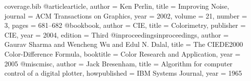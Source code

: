\begin{filecontents*}[overwrite]{coverage.bib}
@article{article, author = {Ken Perlin}, title = {Improving Noise}, journal = {ACM Transactions on Graphics}, year = {2002}, volume = {21}, number = {3}, pages = {681--682}}
@book{book, author = {{CIE}}, title = {Colorimetry}, publisher = {CIE}, year = {2004}, edition = {Third}}
@inproceedings{inproceedings, author = {Gaurav Sharma and Wencheng Wu and Edul N. Dalal}, title = {The {CIEDE2000} Color-Difference Formula}, booktitle = {Color Research and Application}, year = {2005}}
@misc{misc, author = {Jack Bresenham}, title = {Algorithm for computer control of a digital plotter}, howpublished = {IBM Systems Journal}, year = {1965}}
\end{filecontents*}
\documentclass{nicrainha}

\begin{slide}{Citations}
  \cite{article,book,inproceedings,misc}
\end{slide}
\begin{slide}{References}
  
  
\end{slide}

